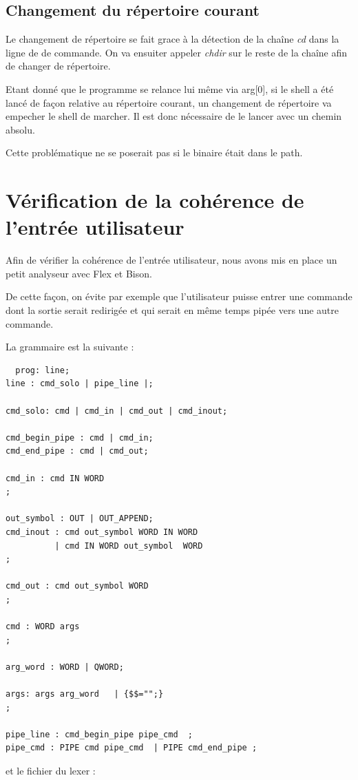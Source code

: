 \documentclass[fr]{article}
\begin{document}
\subsection{Changement du répertoire courant}
Le changement de répertoire se fait grace à la détection de la
chaîne \emph{cd} dans la ligne de de commande. On va ensuiter appeler 
\emph{chdir} sur le reste de la chaîne afin de changer de répertoire.

Etant donné que le programme se relance lui même via arg[0], si le
shell a été lancé de façon relative au répertoire courant, un
changement de répertoire va empecher le shell de marcher. Il est donc
nécessaire de le lancer avec un chemin absolu.

Cette problématique ne se poserait pas si le binaire était dans le path.

\section{Vérification de la cohérence de l'entrée utilisateur}

Afin de vérifier la cohérence de l'entrée utilisateur, nous avons mis
en place un petit analyseur avec Flex et Bison.

De cette façon, on évite par exemple que l'utilisateur puisse entrer une commande 
dont la sortie serait redirigée et qui serait en même temps pipée vers
une autre commande.

La grammaire est la suivante :
\begin{lstlisting}
  prog: line;
line : cmd_solo | pipe_line |;

cmd_solo: cmd | cmd_in | cmd_out | cmd_inout;

cmd_begin_pipe : cmd | cmd_in;
cmd_end_pipe : cmd | cmd_out;

cmd_in : cmd IN WORD 
;

out_symbol : OUT | OUT_APPEND;
cmd_inout : cmd out_symbol WORD IN WORD
          | cmd IN WORD out_symbol  WORD 
;

cmd_out : cmd out_symbol WORD 
;

cmd : WORD args 
;

arg_word : WORD | QWORD;

args: args arg_word   | {$$="";}
;

pipe_line : cmd_begin_pipe pipe_cmd  ;
pipe_cmd : PIPE cmd pipe_cmd  | PIPE cmd_end_pipe ;
\end{lstlisting}

et le fichier du lexer :
\end{document}
